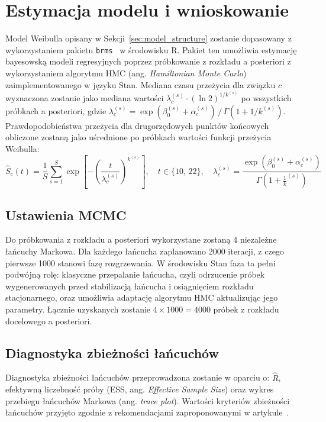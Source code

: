\documentclass[12pt, a4paper]{article}
\begin{document}
\section{Estymacja modelu i wnioskowanie}
Model Weibulla opisany w Sekcji~\ref{sec:model_structure} zostanie dopasowany z wykorzystaniem pakietu \texttt{brms}~\cite{burkner2017brms} w środowisku R. Pakiet ten umożliwia estymację bayesowską modeli regresyjnych poprzez próbkowanie z rozkładu a posteriori z wykorzystaniem algorytmu HMC (ang. \textit{Hamiltonian Monte Carlo}) zaimplementowanego w języku Stan. Mediana czasu przeżycia dla związku $c$ wyznaczona zostanie jako mediana wartości $\lambda_c^{(s)} \cdot (\ln 2)^{1/k^{(s)}}$ po wszystkich próbkach a posteriori, gdzie $\lambda_c^{(s)} = \exp(\beta_0^{(s)} + \alpha_c^{(s)})\,/\,\Gamma(1+1/k^{(s)})$. Prawdopodobieństwa przeżycia dla drugorzędowych punktów końcowych obliczone zostaną jako uśrednione po próbkach wartości funkcji przeżycia Weibulla:
\[
    \hat{S}_c(t) = \frac{1}{S}\sum_{s=1}^{S} \exp\!\left[-\!\left(\frac{t}{\lambda_c^{(s)}}\right)^{\!k^{(s)}}\right], \quad t \in \{10,\, 22\}, \quad \lambda_c^{(s)} = \frac{\exp\!\left(\beta_0^{(s)} + \alpha_c^{(s)}\right)}{\Gamma\!\left(1+\frac{1}{k}^{(s)}\right)}
\]

\subsection{Ustawienia MCMC}
Do próbkowania z rozkładu a posteriori wykorzystane zostaną 4 niezależne łańcuchy Markowa. Dla każdego łańcucha zaplanowano 2000 iteracji, z czego pierwsze 1000 stanowi fazę rozgrzewania. W środowisku Stan faza ta pełni podwójną rolę: klasyczne przepalanie łańcucha, czyli odrzucenie próbek wygenerowanych przed stabilizacją łańcucha i osiągnięciem rozkładu stacjonarnego, oraz umożliwia adaptację algorytmu HMC aktualizując jego parametry. Łącznie uzyskanych zostanie $4 \times 1000 = 4000$ próbek z rozkładu docelowego a posteriori. 

\subsection{Diagnostyka zbieżności łańcuchów}
Diagnostyka zbieżności łańcuchów przeprowadzona zostanie w oparciu o: $\hat{R}$, efektywną liczebność próby (ESS, ang. \textit{Effective Sample Size}) oraz wykres przebiegu łańcuchów Markowa (ang. \textit{trace plot}). Wartości kryteriów zbieżności łańcuchów przyjęto zgodnie z rekomendacjami zaproponowanymi w artykule~\cite{vehtari2019rhat}. 
\end{document}

